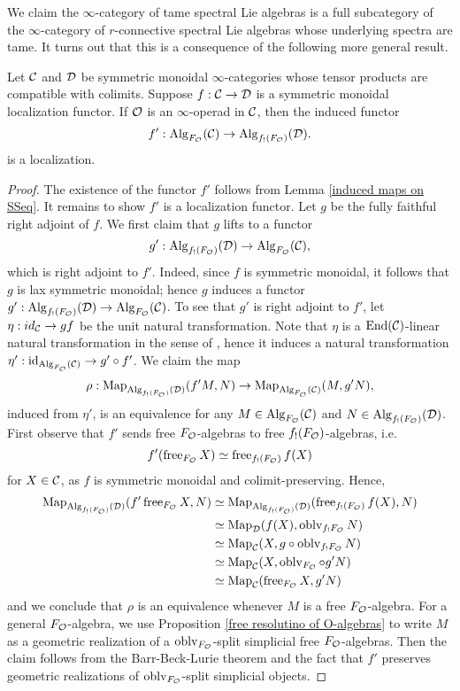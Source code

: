 We claim the $\infty$-category of tame spectral Lie algebras is a full subcategory of the $\infty$-category of $r$-connective spectral Lie algebras whose underlying spectra are tame. It turns out that this is a consequence of the following more general result.
\begin{proposition}
\label{Lifting localization to algebra category}
Let ${\mathcal{C}}$ and ${\mathcal{D}}$ be symmetric monoidal $\infty$-categories whose tensor products are compatible with colimits.
Suppose $f:{\mathcal{C}} \to {\mathcal{D}}$ is a symmetric monoidal localization functor.
If ${\mathcal{O}}$ is an $\infty$-operad in ${\mathcal{C}}$, then the induced functor
$$
f' : \operatorname{Alg}_{F_{\mathcal{O}}}({\mathcal{C}}) \to \operatorname{Alg}_{f_{!}(F_{\mathcal{O}})}({\mathcal{D}}).
$$
is a localization.
\end{proposition}
\begin{proof}
	The existence of the functor $f'$ follows from Lemma \ref{induced maps on SSeq}. It remains to show $f'$ is a localization functor. Let $g$ be the fully faithful right adjoint of $f$. We first claim that $g$ lifts to a functor 
	$$
	g': \operatorname{Alg}_{f_{!}(F_{\mathcal{O}})}({\mathcal{D}})
	\to 
	\operatorname{Alg}_{F_{\mathcal{O}}}({\mathcal{C}}),
	$$
	which is right adjoint to $f'$. 
	Indeed, since $f$ is symmetric monoidal, it follows that $g$ is lax symmetric monoidal; hence $g$ induces a functor $g': \operatorname{Alg}_{f_{!}(F_{\mathcal{O}})}({\mathcal{D}})
	\to 
	\operatorname{Alg}_{F_{\mathcal{O}}}({\mathcal{C}})$.
	To see that $g'$ is right adjoint to $f'$, let $\eta: id_{{\mathcal{C}}} \to gf$ be the unit natural transformation.
	Note that $\eta$ is a $\operatorname{End}({\mathcal{C}})$-linear natural transformation in the sense of \cite[Definition 4.6.2.7.]{HA}, hence it induces a natural transformation $\eta': \operatorname{id}_{\operatorname{Alg}_{F_{{\mathcal{O}}}}({\mathcal{C}})} \to g'\circ f'$.
	We claim the map
	$$
	\rho:
	\operatorname{Map}_{\operatorname{Alg}_{f_{!}(F_{\mathcal{O}})}({\mathcal{D}})}(f'M, N)
	\to 
	\operatorname{Map}_{\operatorname{Alg}_{F_{\mathcal{O}}}({\mathcal{C}})}(M, g'N),
	$$
	induced from $\eta'$,
	is an equivalence for any $M\in \operatorname{Alg}_{F_{\mathcal{O}}}({\mathcal{C}})$ and $N\in \operatorname{Alg}_{f_{!}(F_{\mathcal{O}})}({\mathcal{D}})$. First observe that $f'$ sends free $F_{\mathcal{O}}$-algebras to free $f_{!}(F_{\mathcal{O}})$-algebras, i.e.
	$$
	f'(\operatorname{free}_{F_{{\mathcal{O}}}} X)\simeq \operatorname{free}_{f_{!}(F_{\mathcal{O}})} f(X)
	$$
	for $X\in {\mathcal{C}}$,
	as $f$ is symmetric monoidal and colimit-preserving. 
	Hence, 
    \begin{align*}
        \operatorname{Map}_{\operatorname{Alg}_{f_{!}(F_{\mathcal{O}})}({\mathcal{D}})}(f'\operatorname{free}_{F_{{\mathcal{O}}}} X, N) & \simeq \operatorname{Map}_{\operatorname{Alg}_{f_{!}(F_{\mathcal{O}})}({\mathcal{D}})}(\operatorname{free}_{f_{!}(F_{\mathcal{O}})} f(X), N)\\
        & \simeq \operatorname{Map}_{{\mathcal{D}}}(f(X), \operatorname{oblv}_{f_{!}F_{{\mathcal{O}}}}N)\\
        & \simeq \operatorname{Map}_{{\mathcal{C}}}(X, g \circ \operatorname{oblv}_{f_{!}F_{{\mathcal{O}}}}N)\\
        & \simeq \operatorname{Map}_{{\mathcal{C}}}(X, \operatorname{oblv}_{F_{{\mathcal{O}}}}\circ g' N)\\
        & \simeq \operatorname{Map}_{{\mathcal{C}}}(\operatorname{free}_{F_{{\mathcal{O}}}}  X, g' N)
    \end{align*}	
    and we conclude that
	$\rho$ is an equivalence whenever $M$ is a free $F_{{\mathcal{O}}}$-algebra. For a general $F_{{\mathcal{O}}}$-algebra, we use Proposition \ref{free resolutino of O-algebras} to write $M$ as a geometric realization of a $\operatorname{oblv}_{F_{{\mathcal{O}}}}$-split simplicial free $F_{{\mathcal{O}}}$-algebras. Then the claim follows from the Barr-Beck-Lurie theorem \cite[Theorem 4.7.3.5.]{HA} and the fact that $f'$ preserves geometric realizations of $\operatorname{oblv}_{F_{{\mathcal{O}}}}$-split simplicial objects.
	

\end{proof}
